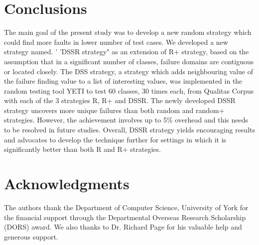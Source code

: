 \documentclass{acm_proc_article-sp}
\begin{document}
\section{Conclusions}\label{sec:conc}
The main goal of the present study was to develop a new random strategy which could find more faults in lower number of test cases. We developed a new strategy named. ' 'DSSR strategy" as an extension of R+ strategy, based on the assumption that in a significant number of classes, failure domains are contiguous or located closely. The DSS strategy, a strategy which adds neighbouring value of the failure finding value to a list of interesting values, was implemented in the random testing tool YETI to test 60 classes, 30 times each, from Qualitas Corpus with each of the 3 strategies R, R+ and DSSR. The newly developed DSSR strategy uncovers more unique failures than both random and random+ strategies. However, the achievement involves up to 5\% overhead and this needs to be resolved in future studies. Overall, DSSR strategy yields encouraging results and advocates to develop the technique further for settings in which it is significantly better than both R and R+ strategies.

\section{Acknowledgments}
The authors thank the Department of Computer Science, University of York for the financial support through the Departmental Overseas Research Scholarship (DORS) award. We also thanks to Dr. Richard Page for his valuable help and generous support.




%

%
%
\end{document}
